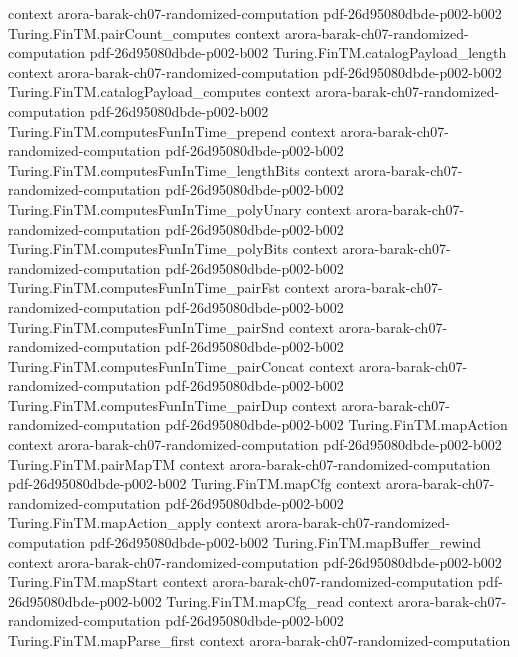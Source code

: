 \begin{theorem}
  {context}
  {arora-barak-ch07-randomized-computation}
  {pdf-26d95080dbde-p002-b002}
\proofstep
  {Turing.FinTM.pairCount_computes}
  {context}
  {arora-barak-ch07-randomized-computation}
  {pdf-26d95080dbde-p002-b002}
\proofstep
  {Turing.FinTM.catalogPayload_length}
  {context}
  {arora-barak-ch07-randomized-computation}
  {pdf-26d95080dbde-p002-b002}
\proofstep
  {Turing.FinTM.catalogPayload_computes}
  {context}
  {arora-barak-ch07-randomized-computation}
  {pdf-26d95080dbde-p002-b002}
\proofstep
  {Turing.FinTM.computesFunInTime_prepend}
  {context}
  {arora-barak-ch07-randomized-computation}
  {pdf-26d95080dbde-p002-b002}
\proofstep
  {Turing.FinTM.computesFunInTime_lengthBits}
  {context}
  {arora-barak-ch07-randomized-computation}
  {pdf-26d95080dbde-p002-b002}
\proofstep
  {Turing.FinTM.computesFunInTime_polyUnary}
  {context}
  {arora-barak-ch07-randomized-computation}
  {pdf-26d95080dbde-p002-b002}
\proofstep
  {Turing.FinTM.computesFunInTime_polyBits}
  {context}
  {arora-barak-ch07-randomized-computation}
  {pdf-26d95080dbde-p002-b002}
\proofstep
  {Turing.FinTM.computesFunInTime_pairFst}
  {context}
  {arora-barak-ch07-randomized-computation}
  {pdf-26d95080dbde-p002-b002}
\proofstep
  {Turing.FinTM.computesFunInTime_pairSnd}
  {context}
  {arora-barak-ch07-randomized-computation}
  {pdf-26d95080dbde-p002-b002}
\proofstep
  {Turing.FinTM.computesFunInTime_pairConcat}
  {context}
  {arora-barak-ch07-randomized-computation}
  {pdf-26d95080dbde-p002-b002}
\proofstep
  {Turing.FinTM.computesFunInTime_pairDup}
  {context}
  {arora-barak-ch07-randomized-computation}
  {pdf-26d95080dbde-p002-b002}
\proofstep
  {Turing.FinTM.mapAction}
  {context}
  {arora-barak-ch07-randomized-computation}
  {pdf-26d95080dbde-p002-b002}
\proofstep
  {Turing.FinTM.pairMapTM}
  {context}
  {arora-barak-ch07-randomized-computation}
  {pdf-26d95080dbde-p002-b002}
\proofstep
  {Turing.FinTM.mapCfg}
  {context}
  {arora-barak-ch07-randomized-computation}
  {pdf-26d95080dbde-p002-b002}
\proofstep
  {Turing.FinTM.mapAction_apply}
  {context}
  {arora-barak-ch07-randomized-computation}
  {pdf-26d95080dbde-p002-b002}
\proofstep
  {Turing.FinTM.mapBuffer_rewind}
  {context}
  {arora-barak-ch07-randomized-computation}
  {pdf-26d95080dbde-p002-b002}
\proofstep
  {Turing.FinTM.mapStart}
  {context}
  {arora-barak-ch07-randomized-computation}
  {pdf-26d95080dbde-p002-b002}
\proofstep
  {Turing.FinTM.mapCfg_read}
  {context}
  {arora-barak-ch07-randomized-computation}
  {pdf-26d95080dbde-p002-b002}
\proofstep
  {Turing.FinTM.mapParse_first}
  {context}
  {arora-barak-ch07-randomized-computation}

\end{theorem}
